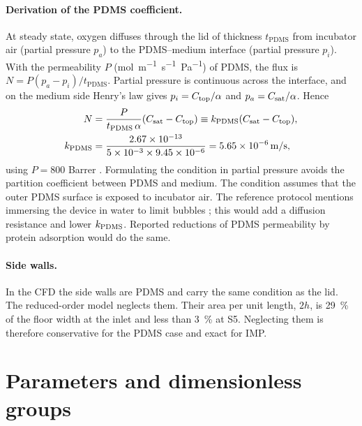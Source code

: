 \paragraph{Derivation of the PDMS coefficient.} At steady state, oxygen diffuses through the lid of thickness $t_{\mathrm{PDMS}}$ from incubator air (partial pressure $p_a$) to the PDMS--medium interface (partial pressure $p_i$). With the permeability $P$ (\si{mol.m^{-1}.s^{-1}.Pa^{-1}}) of PDMS, the flux is $N=P(p_a-p_i)/t_{\mathrm{PDMS}}$. Partial pressure is continuous across the interface, and on the medium side Henry's law gives $p_i=C_{\mathrm{top}}/\alpha$ and $p_a=C_{\mathrm{sat}}/\alpha$. Hence
\begin{equation}
\begin{aligned}
N&=\frac{P}{t_{\mathrm{PDMS}}\,\alpha}(C_{\mathrm{sat}}-C_{\mathrm{top}})\equiv k_{\mathrm{PDMS}}(C_{\mathrm{sat}}-C_{\mathrm{top}}),\\
k_{\mathrm{PDMS}}&=\frac{\num{2.67e-13}}{\num{5e-3}\times\num{9.45e-6}}=\SI{5.65e-6}{m/s},
\end{aligned}
\label{eq:ox_kpdms}
\end{equation}
using $P=800$ Barrer \citep{Merkel2000}. Formulating the condition in partial pressure avoids the partition coefficient between PDMS and medium. The condition assumes that the outer PDMS surface is exposed to incubator air. The reference protocol mentions immersing the device in water to limit bubbles \citep{Delon2020}; this would add a diffusion resistance and lower $k_{\mathrm{PDMS}}$. Reported reductions of PDMS permeability by protein adsorption \citep{Mehta2007} would do the same.

\paragraph{Side walls.} In the CFD the side walls are PDMS and carry the same condition as the lid. The reduced-order model neglects them. Their area per unit length, $2h$, is \SI{29}{\percent} of the floor width at the inlet and less than \SI{3}{\percent} at S5. Neglecting them is therefore conservative for the PDMS case and exact for IMP.

\section{Parameters and dimensionless groups}

